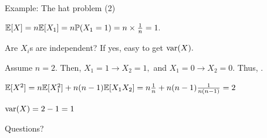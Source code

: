 \begin{frame}{Example: The hat problem (2)}

\plitemsep 0.1in
\bci 
\item<1-> $\mathbb{E}[ X ] = n \mathbb{E}[ X_1 ] = n \mathbb{P}( X_1 =1 ) = n\times \frac{1}{n} = 1.$ 

\item<2->  Are $X_i$s are independent? If yes, easy to get $\text{var}( X ).$

\item<3-> Assume $n=2.$ Then, $X_1=1 \rightarrow X_2=1,$ and $X_1=0 \rightarrow X_2=0.$ Thus, .

\item<7-> $\mathbb{E}[ X^2 ] = n \mathbb{E}[ X_1^2 ] + n(n-1) \mathbb{E}[ X_1 X_2 ] = n\frac{1}{n} + n(n-1)\frac{1}{n(n-1)} = 2$

\item<8-> $\text{var}( X ) = 2-1 =1$ 
\eci
\end{frame}


\begin{frame}{}
\vspace{2cm}
\LARGE Questions?

\end{frame}

